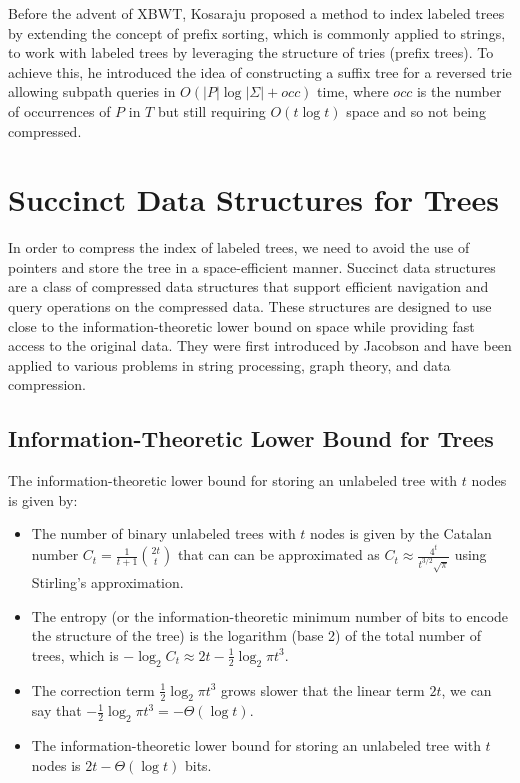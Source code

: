 Before the advent of XBWT, Kosaraju \cite{kosaraju1989efficient} proposed a method to index labeled trees by extending the concept of prefix sorting, which is commonly applied to strings, to work with labeled trees by leveraging the structure of tries (prefix trees). To achieve this, he introduced the idea of constructing a suffix tree for a reversed trie allowing subpath queries in $O(|P|\log|\Sigma|+ occ)$ time, where $occ$ is the number of occurrences of $P$ in $T$ but still requiring $O(t \log t)$ space and so not being compressed.

\section{Succinct Data Structures for Trees}
In order to compress the index of labeled trees, we need to avoid the use of pointers and store the tree in a space-efficient manner. Succinct data structures are a class of compressed data structures that support efficient navigation and query operations on the compressed data. These structures are designed to use close to the information-theoretic lower bound on space while providing fast access to the original data. They were first introduced by Jacobson \cite{jacobson1989space} and have been applied to various problems in string processing, graph theory, and data compression.

\subsection{Information-Theoretic Lower Bound for Trees}
The information-theoretic lower bound for storing an unlabeled tree with $t$ nodes is given by:

\begin{itemize}
    \item The number of binary unlabeled trees with $t$ nodes is given by the Catalan number $C_t = \frac{1}{t+1} \binom{2t}{t}$ that can can be approximated as $C_t \approx \frac{4^t}{t^{3/2}\sqrt{\pi}}$ using Stirling's approximation.
    \item The entropy (or the information-theoretic minimum number of bits to encode the structure of the tree) is the logarithm (base 2) of the total number of trees, which is $-\log_2 C_t \approx 2t - \frac{1}{2} \log_2 \pi t^3$.
    \item The correction term $\frac{1}{2} \log_2 \pi t^3$ grows slower that the linear term $2t$, we can say that $-\frac{1}{2} \log_2 \pi t^3 = -\Theta(\log t)$.
    \item The information-theoretic lower bound for storing an unlabeled tree with $t$ nodes is $2t - \Theta(\log t)$ bits.
\end{itemize}

